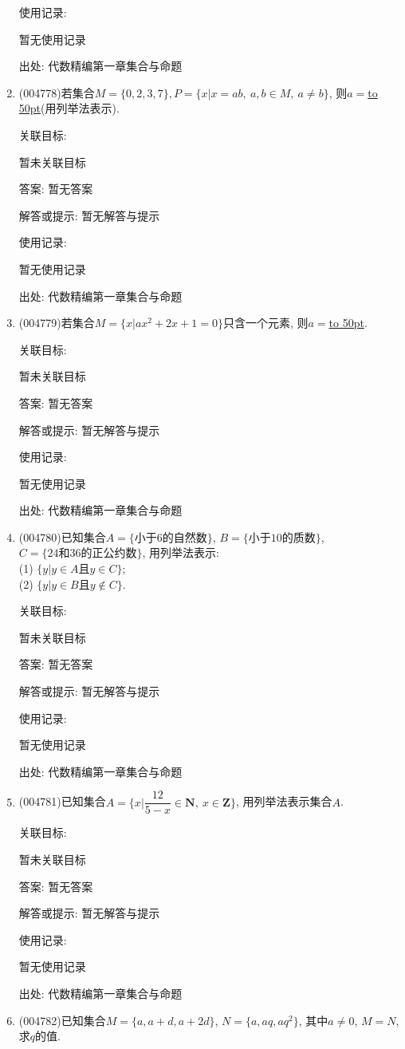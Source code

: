 \documentclass[10pt,a4paper]{article}
\newcommand{\blank}[1]{\underline{\hbox to #1pt{}}}
\begin{document}
\begin{enumerate}[1.]
使用记录:

暂无使用记录


出处: 代数精编第一章集合与命题
\item { (004778)}若集合$M=\{0,2,3,7\},P=\{x|x=ab, \ a,b\in M, \ a\ne b\}$, 则$a=$\blank{50}(用列举法表示).


关联目标:

暂未关联目标

答案: 暂无答案

解答或提示: 暂无解答与提示

使用记录:

暂无使用记录


出处: 代数精编第一章集合与命题
\item { (004779)}若集合$M=\{x|ax^2+2x+1=0\}$只含一个元素, 则$a=$\blank{50}.


关联目标:

暂未关联目标

答案: 暂无答案

解答或提示: 暂无解答与提示

使用记录:

暂无使用记录


出处: 代数精编第一章集合与命题
\item { (004780)}已知集合$A=\{\text{小于}6\text{的自然数}\}$, $B=\{\text{小于}10\text{的质数}\}$, $C=\{24\text{和}36\text{的正公约数}\}$, 用列举法表示:\\
(1) $\{y|y\in A\text{且}y\in C\}$;\\
(2) $\{y|y\in B\text{且}y\notin C\}$.


关联目标:

暂未关联目标

答案: 暂无答案

解答或提示: 暂无解答与提示

使用记录:

暂无使用记录


出处: 代数精编第一章集合与命题
\item { (004781)}已知集合$A=\{x|\dfrac{12}{5-x}\in \mathbf{N},\ x\in\mathbf{Z}\}$, 用列举法表示集合$A$.


关联目标:

暂未关联目标

答案: 暂无答案

解答或提示: 暂无解答与提示

使用记录:

暂无使用记录


出处: 代数精编第一章集合与命题
\item { (004782)}已知集合$M=\{a,a+d,a+2d\}$, $N=\{a,aq,aq^2\}$, 其中$a\ne 0$, $M=N$, 求$q$的值.



\end{enumerate}
\end{document}
